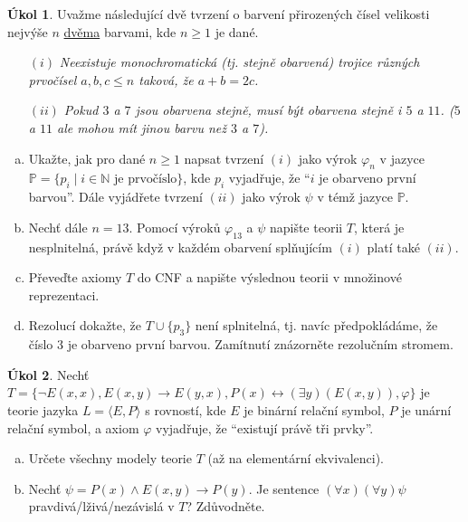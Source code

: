 \documentclass{amsart}
\theoremstyle{definition}
\newtheorem{task}{Úkol}
\begin{document}
\begin{task}
Uvažme následující dvě tvrzení o barvení přirozených čísel velikosti nejvýše $n$ \underline{dvěma} barvami, kde $n\ge 1$ je dané.
\begin{enumerate}
\item[$(i)$] {\it Neexistuje monochromatická (tj. stejně obarvená) trojice různých prvočísel  $a,b,c \le n$ taková, že $a+b=2c$.}
\item[$(ii)$] {\it Pokud $3$ a $7$ jsou obarvena stejně, musí být obarvena stejně i $5$ a $11$. ($5$ a $11$ ale mohou mít jinou barvu než $3$ a $7$).}
\end{enumerate}


\bigskip

\begin{enumerate}[(a)]
\item Ukažte, jak pro dané $n\ge 1$ napsat tvrzení $(i)$ jako výrok $\varphi_n$ v jazyce $\mathbb{P}=\{p_i \mid i\in \mathbb{N}\text{ je prvočíslo}\}$, kde $p_i$ vyjadřuje, že ``$i$ je obarveno první barvou''. Dále vyjádřete tvrzení $(ii)$ jako výrok $\psi$ v témž jazyce $\mathbb{P}$.
\item Nechť dále $n=13$. Pomocí výroků $\varphi_{13}$ a $\psi$ napište teorii $T$, která je nesplnitelná, právě když v každém obarvení splňujícím $(i)$ platí také $(ii)$.
\item Převeďte axiomy $T$ do CNF a napište výslednou teorii v množinové reprezentaci.
\item Rezolucí dokažte, že $T \cup \{p_3\}$ není splnitelná, tj. navíc předpokládáme, že číslo 3 je obarveno první barvou. Zamítnutí znázorněte rezolučním stromem.

\end{enumerate}
\end{task}

\bigskip

\begin{task}
Nechť $T = \{\neg E(x, x), E(x, y) \to E(y, x), P(x) \leftrightarrow (\exists y)( E(x,y)),\varphi\}$ je teorie jazyka $L =\langle E, P\rangle$ s rovností, kde $E$ je binární relační symbol, $P$ je unární relační symbol, a axiom $\varphi$ vyjadřuje, že ``existují právě tři prvky''.
\begin{enumerate}[(a)]
\item Určete všechny modely teorie $T$ (až na elementární ekvivalenci).
\item Nechť $\psi=P(x)\wedge E(x,y)\to P(y)$. Je sentence $(\forall x)(\forall y)\psi$ pravdivá/lživá/nezávislá v $T$? Zdůvodněte.
\end{enumerate}
\end{task}
\end{document}
